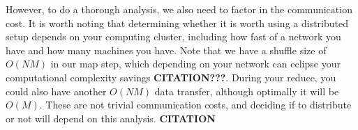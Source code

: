 \vspace{5 mm}
\noindent
However, to do a thorough analysis, we also need to factor in the communication 
cost. It is worth noting that determining whether it is worth using a 
distributed setup depends on your computing cluster, including how fast of a 
network you have and how many machines you have. Note that we have a shuffle 
size of $O(N M)$ in our map step, which depending on your network can 
eclipse your computational complexity savings \textbf{CITATION???}. During your 
reduce, you could also have another $O(N M)$ data transfer, although optimally 
it will be $O(M)$. These are not trivial communication costs, and deciding if 
to distribute or not will depend on this analysis. \textbf{CITATION}

\newpage